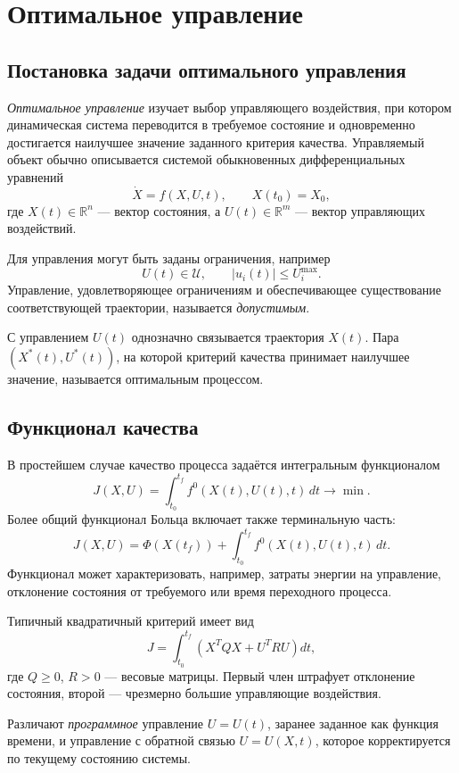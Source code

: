 \section{Оптимальное управление}
\label{sec:optimal-control}

\subsection{Постановка задачи оптимального управления}

\emph{Оптимальное управление} изучает выбор управляющего воздействия, при
котором динамическая система переводится в требуемое состояние и одновременно
достигается наилучшее значение заданного критерия качества. Управляемый объект
обычно описывается системой обыкновенных дифференциальных уравнений
\[
    \dot X=f(X,U,t),\qquad X(t_0)=X_0,
\]
где $X(t)\in\mathbb R^n$ --- вектор состояния, а
$U(t)\in\mathbb R^m$ --- вектор управляющих воздействий.

Для управления могут быть заданы ограничения, например
\[
    U(t)\in\mathcal U,
    \qquad |u_i(t)|\leq U_i^{\max}.
\]
Управление, удовлетворяющее ограничениям и обеспечивающее существование
соответствующей траектории, называется \emph{допустимым}.

С управлением $U(t)$ однозначно связывается траектория $X(t)$. Пара
$(X^*(t),U^*(t))$, на которой критерий качества принимает наилучшее значение,
называется оптимальным процессом.

\subsection{Функционал качества}

В простейшем случае качество процесса задаётся интегральным функционалом
\[
    J(X,U)=\int_{t_0}^{t_f} f^0(X(t),U(t),t)\,dt
    \longrightarrow \min.
\]
Более общий функционал Больца включает также терминальную часть:
\[
    J(X,U)=\Phi(X(t_f))+
    \int_{t_0}^{t_f} f^0(X(t),U(t),t)\,dt.
\]
Функционал может характеризовать, например, затраты энергии на управление,
отклонение состояния от требуемого или время переходного процесса.

Типичный квадратичный критерий имеет вид
\[
    J=\int_{t_0}^{t_f}
    \left(X^TQX+U^TRU\right)dt,
\]
где $Q\geq0$, $R>0$ --- весовые матрицы. Первый член штрафует отклонение
состояния, второй --- чрезмерно большие управляющие воздействия.

Различают \emph{программное} управление $U=U(t)$, заранее заданное как функция
времени, и управление с обратной связью $U=U(X,t)$, которое корректируется по
текущему состоянию системы.

